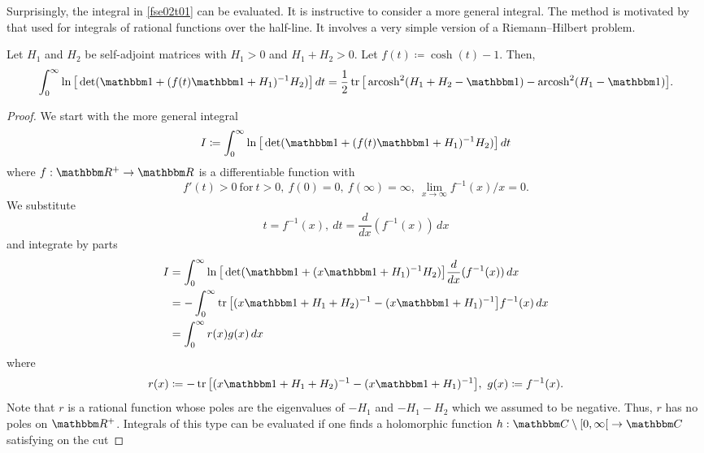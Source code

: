 Surprisingly, the integral in \eqref{fse02t01} can be evaluated.
It is instructive to consider a more general integral.
The method is motivated by that used for integrals of rational functions over the half-line. 
It involves a very simple version of a Riemann--Hilbert problem.

\begin{lemma}\label{integral01t}
Let $H_1$ and $H_2$ be self-adjoint matrices with $H_1>0$ and $H_1+H_2>0$. Let $f(t)\coloneqq\cosh(t)-1$. Then,
\begin{equation}\label{integral01t01}
  \int_0^\infty \ln\big[\det( \id + (f(t)\id+H_1)^{-1}H_2 ) \big] \, dt =
     \frac{1}{2} \tr\big[ \arcosh^2(H_1+H_2-\id) - \arcosh^2(H_1-\id) \big].
\end{equation}
\end{lemma}
\begin{proof}
We start with the more general integral
\begin{equation*}
  I \coloneqq \int_0^\infty \ln\big[\det(\id+(f(t)\id+H_1)^{-1}H_2)\big]\, dt
\end{equation*}
where $f:\R^+\to\R$ is a differentiable function with 
\begin{equation*}
   f'(t)> 0\ \text{for}\ t>0,\
   f(0)=0,\ f(\infty)=\infty,\ \lim_{x\to\infty} f^{-1}(x)/x =0 .
\end{equation*}
We substitute
\begin{equation*}
  t = f^{-1}(x),\ dt = \frac{d}{dx}(f^{-1}(x))\, dx
\end{equation*}
and integrate by parts
\begin{equation*}
\begin{split}
  I  & = \int_0^\infty \ln\big[\det( \id + (x\id+H_1)^{-1}H_2)\big] \frac{d}{dx}( f^{-1}(x) )\, dx\\
     & = - \int_0^\infty \tr\big[ (x\id+H_1+H_2)^{-1} - (x\id+H_1)^{-1} \big] f^{-1}(x)\, dx\\
     & = \int_0^\infty r(x) g(x)\, dx
\end{split}
\end{equation*}
where
\begin{equation*}
   r(x) \coloneqq - \tr\big[ (x\id+H_1+H_2)^{-1} - (x\id+H_1)^{-1} \big],\ g(x)\coloneqq f^{-1}(x).
\end{equation*}
Note that $r$ is a rational function whose poles are the eigenvalues of $-H_1$ and $-H_1-H_2$ which we assumed to be negative. 
Thus, $r$ has no poles on $\R^+$. Integrals of this type can be evaluated if one finds a
holomorphic function $h:\C\setminus\interval[open right]{0}{\infty}\to\C$ satisfying on the cut

\end{proof}
